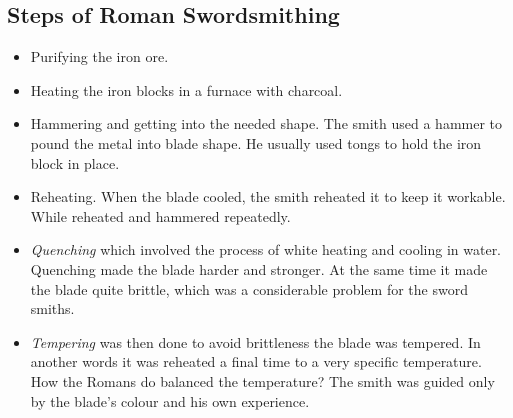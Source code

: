 \subsection{Steps of Roman Swordsmithing}
\begin{itemize}
\item Purifying the iron ore. 
\item Heating the iron blocks in a furnace with charcoal. 
\item Hammering and getting into the needed shape. The smith used a hammer to pound the metal into blade shape. He usually used tongs to hold the iron block in place. 
\item Reheating. When the blade cooled, the smith reheated it to keep it workable. While reheated and hammered repeatedly.
\item \emph{Quenching} which involved the process of white heating and cooling in water. Quenching made the blade harder and stronger. At the same time it made the blade quite brittle, which was a considerable problem for the sword smiths.
\item \emph{Tempering} was then done to avoid brittleness the blade was tempered. In another words it was reheated a final time to a very specific temperature. How the Romans do balanced the temperature? The smith was guided only by the blade's colour and his own experience. 
\end{itemize}

